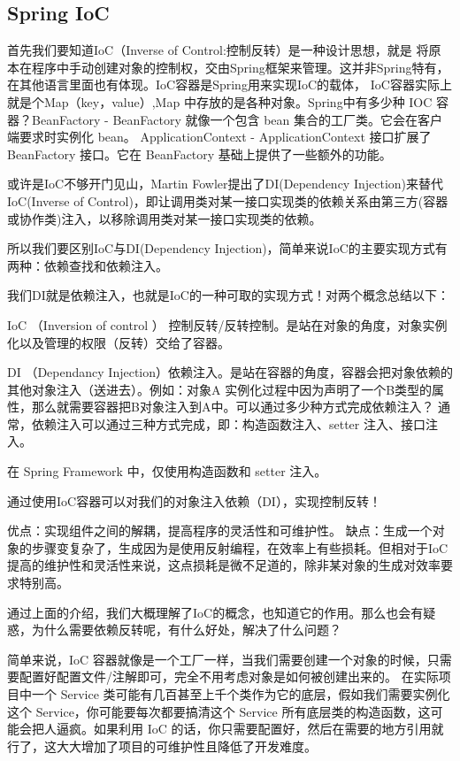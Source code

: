 \documentclass[../../../interview-questions.tex]{subfiles}
\begin{document}
\subsection{Spring IoC}

首先我们要知道IoC（Inverse of Control:控制反转）是一种设计思想，就是 将原本在程序中手动创建对象的控制权，交由Spring框架来管理。这并非Spring特有，在其他语言里面也有体现。IoC容器是Spring用来实现IoC的载体， IoC容器实际上就是个Map（key，value）,Map 中存放的是各种对象。Spring中有多少种 IOC 容器？BeanFactory - BeanFactory 就像一个包含 bean 集合的工厂类。它会在客户端要求时实例化 bean。
ApplicationContext - ApplicationContext 接口扩展了 BeanFactory 接口。它在 BeanFactory 基础上提供了一些额外的功能。

或许是IoC不够开门见山，Martin Fowler提出了DI(Dependency Injection)来替代IoC(Inverse of Control)，即让调用类对某一接口实现类的依赖关系由第三方(容器或协作类)注入，以移除调用类对某一接口实现类的依赖。

所以我们要区别IoC与DI(Dependency Injection)，简单来说IoC的主要实现方式有两种：依赖查找和依赖注入。

我们DI就是依赖注入，也就是IoC的一种可取的实现方式！对两个概念总结以下：

IoC （Inversion of control ） 控制反转/反转控制。是站在对象的角度，对象实例化以及管理的权限（反转）交给了容器。

DI （Dependancy Injection）依赖注入。是站在容器的角度，容器会把对象依赖的其他对象注入（送进去）。例如：对象A 实例化过程中因为声明了一个B类型的属性，那么就需要容器把B对象注入到A中。可以通过多少种方式完成依赖注入？
通常，依赖注入可以通过三种方式完成，即：构造函数注入、setter 注入、接口注入。

在 Spring Framework 中，仅使用构造函数和 setter 注入。

通过使用IoC容器可以对我们的对象注入依赖（DI），实现控制反转！

优点：实现组件之间的解耦，提高程序的灵活性和可维护性。
缺点：生成一个对象的步骤变复杂了，生成因为是使用反射编程，在效率上有些损耗。但相对于IoC提高的维护性和灵活性来说，这点损耗是微不足道的，除非某对象的生成对效率要求特别高。

通过上面的介绍，我们大概理解了IoC的概念，也知道它的作用。那么也会有疑惑，为什么需要依赖反转呢，有什么好处，解决了什么问题？

简单来说，IoC 容器就像是一个工厂一样，当我们需要创建一个对象的时候，只需要配置好配置文件/注解即可，完全不用考虑对象是如何被创建出来的。 在实际项目中一个 Service 类可能有几百甚至上千个类作为它的底层，假如我们需要实例化这个 Service，你可能要每次都要搞清这个 Service 所有底层类的构造函数，这可能会把人逼疯。如果利用 IoC 的话，你只需要配置好，然后在需要的地方引用就行了，这大大增加了项目的可维护性且降低了开发难度。
\end{document}

